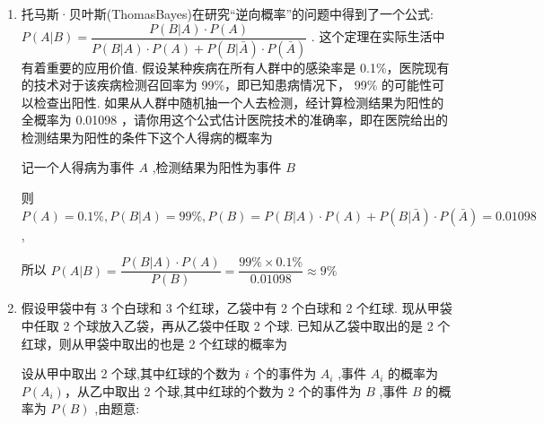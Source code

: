 \begin{enumerate}
\begin{enumerate}
        \item 托马斯·贝叶斯(ThomasBayes)在研究“逆向概率”的问题中得到了一个公式: $P\left( {A|B}\right)  = \dfrac{P\left( {B|A}\right)  \cdot  P\left( A\right) }{P\left( {B|A}\right)  \cdot  P\left( A\right)  + P\left( {B|\bar{A}}\right)  \cdot  P\left( \bar{A}\right) }$ . 这个定理在实际生活中有着重要的应用价值. 假设某种疾病在所有人群中的感染率是 0.1\%，医院现有的技术对于该疾病检测召回率为 99\%，即已知患病情况下， 99\% 的可能性可以检查出阳性. 如果从人群中随机抽一个人去检测，经计算检测结果为阳性的全概率为 0.01098 ，请你用这个公式估计医院技术的准确率，即在医院给出的检测结果为阳性的条件下这个人得病的概率为
        \begin{jieda}
            记一个人得病为事件 $A$ ,检测结果为阳性为事件 $B$
            
            则 $P\left( A\right)  = {0.1}\% ,P\left( {B|A}\right)  = {99}\% ,P(B) = P\left( {B|A}\right)  \cdot  P\left( A\right)  + P\left( {B|\bar{A}}\right)  \cdot  P\left( \bar{A}\right)  = {0.01098}$ ,
            
            所以 $P\left( {A|B}\right)  = \dfrac{P\left( {B|A}\right)  \cdot  P\left( A\right) }{P(B)} = \dfrac{{99}\%  \times  {0.1}\% }{0.01098} \approx  9\%$ 
        \end{jieda}
        
        \item 假设甲袋中有 3 个白球和 3 个红球，乙袋中有 2 个白球和 2 个红球. 现从甲袋中任取 2 个球放入乙袋，再从乙袋中任取 2 个球. 已知从乙袋中取出的是 2 个红球，则从甲袋中取出的也是 2 个红球的概率为
        \begin{jieda}
            设从甲中取出 2 个球,其中红球的个数为 $i$ 个的事件为 ${A}_{i}$ ,事件 ${A}_{i}$ 的概率为 $P\left( {A}_{i}\right)$，从乙中取出 2 个球,其中红球的个数为 2 个的事件为 $B$ ,事件 $B$ 的概率为 $P\left( B\right)$ ,由题意:


\end{jieda}
\end{enumerate}
\end{enumerate}
